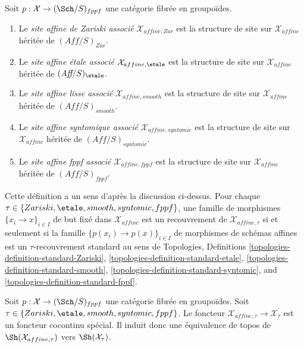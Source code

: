 \begin{definition}
\label{definition-alternative-inherited-topologies}
Soit $p : \mathcal{X} \to (\Sch/S)_{fppf}$ une catégorie fibrée en groupoïdes.
\begin{enumerate}
\item Le {\it site affine de Zariski associé} $\mathcal{X}_{affine, Zar}$
est la structure de site sur $\mathcal{X}_{affine}$ héritée de
$(\textit{Aff}/S)_{Zar}$.
\item Le {\it site affine étale associé} $\mathcal{X}_{affine, \etale}$
est la structure de site sur $\mathcal{X}_{affine}$ héritée de
$(\textit{Aff}/S)_\etale$.
\item Le {\it site affine lisse associé}
$\mathcal{X}_{affine, smooth}$
est la structure de site sur $\mathcal{X}_{affine}$ héritée de
$(\textit{Aff}/S)_{smooth}$.
\item Le {\it site affine syntomique associé} $\mathcal{X}_{affine, syntomic}$
est la structure de site sur $\mathcal{X}_{affine}$ héritée de
$(\textit{Aff}/S)_{syntomic}$.
\item Le {\it site affine fppf associé} $\mathcal{X}_{affine, fppf}$
est la structure de site sur $\mathcal{X}_{affine}$ héritée de
$(\textit{Aff}/S)_{fppf}$.
\end{enumerate}
\end{definition}

\noindent
Cette définition a un sens d'après la discussion ci-dessus. Pour chaque
$\tau \in \{Zariski, \etale, smooth, syntomic, fppf\}$, une
famille de morphismes $\{x_i \to x\}_{i \in I}$ de but fixé
dans $\mathcal{X}_{affine}$ est un recouvrement de $\mathcal{X}_{affine, \tau}$
si et seulement si la famille $\{p(x_i) \to p(x)\}_{i \in I}$
de morphismes de schémas affines est un $\tau$-recouvrement standard au sens de
Topologies, Definitions
\ref{topologies-definition-standard-Zariski},
\ref{topologies-definition-standard-etale},
\ref{topologies-definition-standard-smooth},
\ref{topologies-definition-standard-syntomic}, and
\ref{topologies-definition-standard-fppf}.

\begin{lemma}
\label{lemma-alternative}
Soit $p : \mathcal{X} \to (\Sch/S)_{fppf}$ une catégorie fibrée en groupoïdes.
Soit $\tau \in \{Zariski, \etale, smooth, syntomic, fppf\}$. Le foncteur
$\mathcal{X}_{affine, \tau} \to \mathcal{X}_\tau$ est un foncteur
cocontinu spécial. Il induit donc une équivalence de topos
de $\Sh(\mathcal{X}_{affine, \tau})$ vers $\Sh(\mathcal{X}_\tau)$.
\end{lemma}

